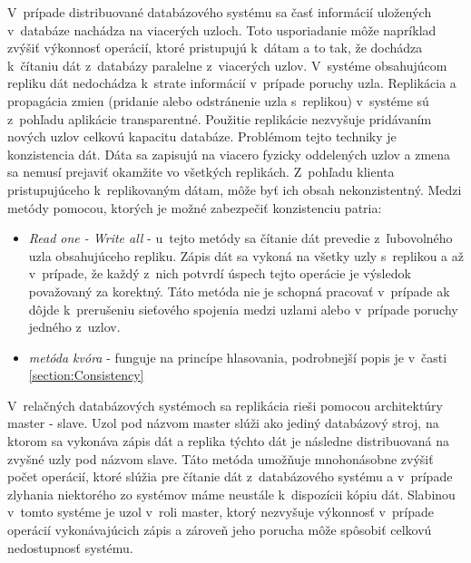 \documentclass[11pt,twoside,a4paper]{book}
\begin{document}
V~prípade distribuované databázového systému sa časť informácií uložených v~databáze nachádza na viacerých uzloch. Toto usporiadanie môže napríklad zvýšiť výkonnosť operácií, ktoré pristupujú k~dátam a to tak, že dochádza k~čítaniu dát z~databázy paralelne z~viacerých uzlov. V~systéme obsahujúcom repliku dát nedochádza k~strate informácií v~prípade poruchy uzla. Replikácia a propagácia zmien (pridanie alebo odstránenie uzla s~replikou) v~systéme sú z~pohľadu aplikácie transparentné. Použitie replikácie nezvyšuje pridávaním nových uzlov celkovú kapacitu databáze. Problémom tejto techniky je konzistencia dát. Dáta sa zapisujú na viacero fyzicky oddelených uzlov a zmena sa nemusí prejaviť okamžite vo všetkých replikách. Z~pohľadu klienta pristupujúceho k~replikovaným dátam, môže byť ich obsah nekonzistentný. Medzi metódy pomocou, ktorých je možné zabezpečiť konzistenciu patria:
\begin{itemize}
  \item
      \emph{Read one - Write all} - u~tejto metódy sa čítanie dát prevedie z~ľubovolného uzla obsahujúceho repliku. Zápis dát sa vykoná na všetky uzly s~replikou a až v~prípade, že každý z~nich potvrdí úspech tejto operácie je výsledok považovaný za korektný. Táto metóda nie je schopná pracovať v~prípade ak dôjde k~prerušeniu sieťového spojenia medzi uzlami alebo v~prípade poruchy jedného z~uzlov.
  \item
      \emph{metóda kvóra} - funguje na princípe hlasovania, podrobnejší popis je v~časti \ref{section:Consistency}

\end{itemize}



V~relačných databázových systémoch sa replikácia rieši pomocou architektúry master - slave. Uzol pod názvom master slúži ako jediný databázový stroj, na ktorom sa vykonáva zápis dát a replika týchto dát je následne distribuovaná na zvyšné uzly pod názvom slave. Táto metóda umožňuje mnohonásobne zvýšiť počet operácií, ktoré slúžia pre čítanie dát z~databázového systému a v~prípade zlyhania niektorého zo systémov máme neustále k~dispozícii kópiu dát. Slabinou v~tomto systéme je uzol v~roli master, ktorý nezvyšuje výkonnosť v~prípade operácií vykonávajúcich zápis a zároveň jeho porucha môže spôsobiť celkovú nedostupnosť systému.
\end{document}
